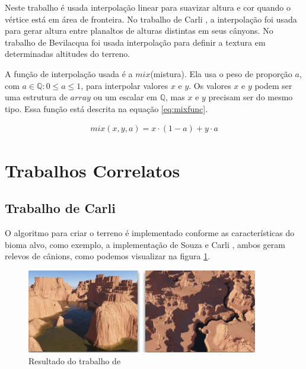 Neste trabalho é usada interpolação linear para suavizar altura e cor quando
o vértice está em área de fronteira. No trabalho de Carli \cite{carli2012canion}, a interpolação 
foi usada para gerar altura entre planaltos de alturas distintas em seus cânyons. No 
trabalho de Bevilacqua \cite{fernando2009costas} foi usada interpolação para definir a textura 
em  determinadas altitudes do terreno.

A função de interpolação usada é a $mix$(mistura). Ela usa o peso de proporção $a$, 
com $a \in \mathbb{Q}: 0 \leq a \leq 1$, para interpolar valores $x$ e $y$. Os valores $x$ e $y$
podem ser uma estrutura de $array$ ou um escalar em $\mathbb{Q}$, mas $x$ e $y$ precisam ser do mesmo tipo.
Essa função está descrita na equação \ref{eq:mixfunc}.

\begin{equation}\label{eq:mixfunc}
  \begin{split}
    mix(x, y, a) = x \cdot (1 - a) + y \cdot a
  \end{split}
\end{equation}

\section{Trabalhos Correlatos}
\subsection{Trabalho de Carli}
O algoritmo para criar o terreno é implementado conforme as
características do bioma alvo, como exemplo, a implementação de Souza
\cite{gabrielle2016canion} e Carli \cite{carli2012canion}, ambos geram relevos de
cânions, como podemos visualizar na figura \ref{fig:carli2012result}.
\begin{figure}[H]
    \centering
    \includegraphics[width=0.9\textwidth]{figuras/carli2012result.png}
    \caption{Resultado do trabalho de \cite{carli2012canion}}
    \label{fig:carli2012result}
\end{figure}

